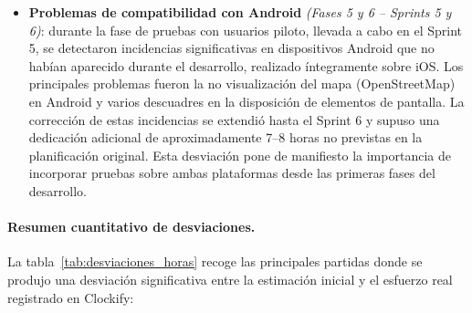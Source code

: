 \begin{itemize}
    \item \textbf{Problemas de compatibilidad con Android} \textit{(Fases 5 y 6 – Sprints 5 y 6)}: durante la fase de pruebas con usuarios piloto, llevada a cabo en el Sprint 5, se detectaron incidencias significativas en dispositivos Android que no habían aparecido durante el desarrollo, realizado íntegramente sobre iOS. Los principales problemas fueron la no visualización del mapa (OpenStreetMap) en Android y varios descuadres en la disposición de elementos de pantalla. La corrección de estas incidencias se extendió hasta el Sprint 6 y supuso una dedicación adicional de aproximadamente 7--8 horas no previstas en la planificación original. Esta desviación pone de manifiesto la importancia de incorporar pruebas sobre ambas plataformas desde las primeras fases del desarrollo.
\end{itemize}

\paragraph{Resumen cuantitativo de desviaciones.}

La tabla~\ref{tab:desviaciones_horas} recoge las principales partidas donde se produjo una desviación significativa entre la estimación inicial y el esfuerzo real registrado en Clockify:

\begin{table}[H]
\centering
\caption{Resumen cuantitativo de desviaciones por área}
\label{tab:desviaciones_horas}
\end{table}

